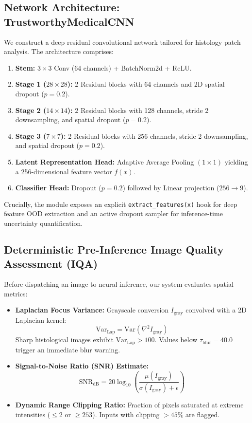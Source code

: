 \documentclass[11pt,a4paper]{article}
\begin{document}
\subsection{Network Architecture: TrustworthyMedicalCNN}
We construct a deep residual convolutional network tailored for histology patch analysis. The architecture comprises:
\begin{enumerate}[leftmargin=*]
    \item \textbf{Stem:} $3 \times 3$ Conv (64 channels) + BatchNorm2d + ReLU.
    \item \textbf{Stage 1 ($28 \times 28$):} 2 Residual blocks with 64 channels and 2D spatial dropout ($p=0.2$).
    \item \textbf{Stage 2 ($14 \times 14$):} 2 Residual blocks with 128 channels, stride 2 downsampling, and spatial dropout ($p=0.2$).
    \item \textbf{Stage 3 ($7 \times 7$):} 2 Residual blocks with 256 channels, stride 2 downsampling, and spatial dropout ($p=0.2$).
    \item \textbf{Latent Representation Head:} Adaptive Average Pooling $(1 \times 1)$ yielding a 256-dimensional feature vector $f(x)$.
    \item \textbf{Classifier Head:} Dropout ($p=0.2$) followed by Linear projection ($256 \to 9$).
\end{enumerate}
Crucially, the module exposes an explicit \texttt{extract\_features(x)} hook for deep feature OOD extraction and an active dropout sampler for inference-time uncertainty quantification.

\subsection{Deterministic Pre-Inference Image Quality Assessment (IQA)}
Before dispatching an image to neural inference, our system evaluates spatial metrics:
\begin{itemize}[leftmargin=*]
    \item \textbf{Laplacian Focus Variance:} Grayscale conversion $I_{\text{gray}}$ convolved with a 2D Laplacian kernel:
    \begin{equation}
        \text{Var}_{\text{Lap}} = \mathrm{Var}\left( \nabla^2 I_{\text{gray}} \right)
    \end{equation}
    Sharp histological images exhibit $\text{Var}_{\text{Lap}} > 100$. Values below $\tau_{\text{blur}} = 40.0$ trigger an immediate blur warning.
    \item \textbf{Signal-to-Noise Ratio (SNR) Estimate:}
    \begin{equation}
        \text{SNR}_{\text{dB}} = 20 \log_{10} \left( \frac{\mu(I_{\text{gray}})}{\sigma(I_{\text{gray}}) + \epsilon} \right)
    \end{equation}
    \item \textbf{Dynamic Range Clipping Ratio:} Fraction of pixels saturated at extreme intensities ($\le 2$ or $\ge 253$). Inputs with clipping $> 45\%$ are flagged.
\end{itemize}
\end{document}
